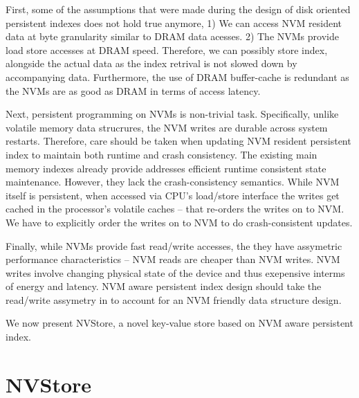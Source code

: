 First, some of the assumptions that were made during the design of disk oriented persistent
indexes does not hold true anymore, 1) We can access NVM resident data at byte granularity similar to
DRAM data acesses. 2) The NVMs provide load store accesses at DRAM speed. Therefore, we can
possibly store index, alongside the actual data as the index retrival is not slowed down by
accompanying data. Furthermore, the use of DRAM buffer-cache is redundant as the NVMs are 
as good as DRAM in terms of access latency.

Next, persistent programming on NVMs is non-trivial task. Specifically, unlike volatile memory
data strucrures, the NVM writes are durable across system restarts. Therefore, care should be
taken when updating NVM resident persistent index to maintain both runtime and crash consistency.
The existing main memory indexes already provide addresses efficient runtime consistent state 
maintenance. However, they lack the crash-consistency semantics. While NVM itself is persistent,
when accessed via CPU's load/store interface the writes get cached in the processor's volatile
caches -- that re-orders the writes on to NVM. We have to explicitly order the writes on to NVM
to do crash-consistent updates.


Finally, while NVMs provide fast read/write accesses, the they have assymetric performance 
characteristics -- NVM reads are cheaper than NVM writes. NVM writes involve changing physical
state of the device and thus exepensive interms of energy and latency. NVM aware persistent 
index design should take the read/write assymetry in to account for an NVM friendly data
structure design.

We now present NVStore, a novel key-value store based on NVM aware persistent index.

\cite{pmwcas}



\section{NVStore}

